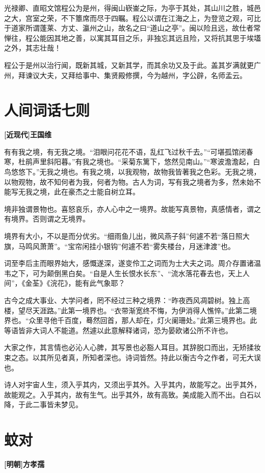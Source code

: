 \documentclass[UTF8,titlepage,oneside]{ctexbook}
\begin{document}
光禄卿、直昭文馆程公为是州，得闽山嵚崟之际，为亭于其处，其山川之胜，城邑之大，宫室之荣，不下簟席而尽于四瞩。程公以谓在江海之上，为登览之观，可比于道家所谓蓬莱、方丈、瀛州之山，故名之曰“道山之亭”。闽以险且远，故仕者常惮往，程公能因其地之善，以寓其耳目之乐，非独忘其远且险，又将抗其思于埃壒之外，其志壮哉！


程公于是州以治行闻，既新其城，又新其学，而其余功又及于此。盖其岁满就更广州，拜谏议大夫，又拜给事中、集贤殿修撰，今为越州，字公辟，名师孟云。



\chapter*{人间词话七则}
\begin{center}
	\textbf{[近现代]王国维}
\end{center}

有有我之境，有无我之境。“泪眼问花花不语，乱红飞过秋千去。”“可堪孤馆闭春寒，杜鹃声里斜阳暮。”有我之境也。“采菊东篱下，悠然见南山。”“寒波澹澹起，白鸟悠悠下。”无我之境也。有我之境，以我观物，故物我皆著我之色彩。无我之境，以物观物，故不知何者为我，何者为物。古人为词，写有我之境者为多，然未始不能写无我之境，此在豪杰之士能自树立耳。

境非独谓景物也。喜怒哀乐，亦人心中之一境界。故能写真景物，真感情者，谓之有境界。否则谓之无境界。

境界有大小，不以是而分优劣。“细雨鱼儿出，微风燕子斜”何遽不若“落日照大旗，马鸣风萧萧”。“宝帘闲挂小银钩”何遽不若“雾失楼台，月迷津渡”也。

词至李后主而眼界始大，感慨遂深，遂变伶工之词而为士大夫之词。周介存置诸温韦之下，可为颠倒黑白矣。“自是人生长恨水长东”、“流水落花春去也，天上人间”，《金荃》《浣花》，能有此气象耶？

古今之成大事业、大学问者，罔不经过三种之境界：“昨夜西风凋碧树。独上高楼，望尽天涯路。”此第一境界也。“衣带渐宽终不悔，为伊消得人憔悴。”此第二境界也。“众里寻他千百度，蓦然回首，那人却在，灯火阑珊处。”此第三境界也。此等语皆非大词人不能道。然遽以此意解释诸词，恐为晏欧诸公所不许也。

大家之作，其言情也必沁人心脾，其写景也必豁人耳目。其辞脱口而出，无矫揉妆束之态。以其所见者真，所知者深也。诗词皆然。持此以衡古今之作者，可无大误也。

诗人对宇宙人生，须入乎其内，又须出乎其外。入乎其内，故能写之。出乎其外，故能观之。入乎其内，故有生气。出乎其外，故有高致。美成能入而不出。白石以降，于此二事皆未梦见。


\chapter*{蚊对}
\begin{center}
	\textbf{[明朝]方孝孺}
\end{center}
\end{document}
